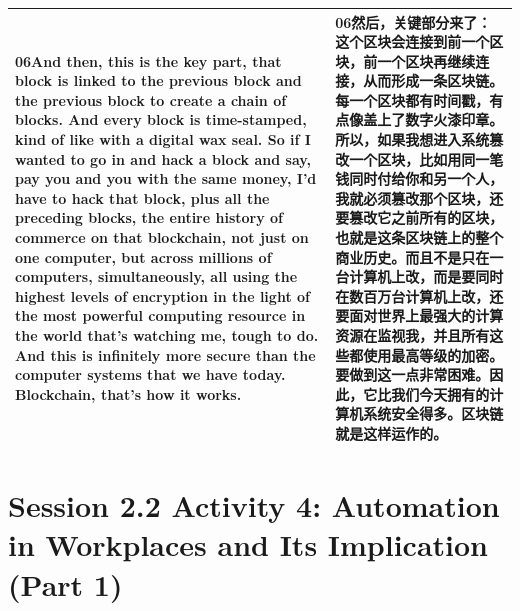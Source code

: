 \documentclass[UTF8,zihao=-4,fontset=fandol]{ctexart}
\newcommand{\TranscriptColumn}{\raggedright\arraybackslash\hyphenpenalty=10000\exhyphenpenalty=10000\sloppy}
\begin{document}
\begin{longtable}{>{\TranscriptColumn}p{} >{\TranscriptColumn}p{}}
\textbf{06}\quad And then, this is the key part, that block is linked to the previous block and the previous block to create a chain of blocks. And every block is time-stamped, kind of like with a digital wax seal. So if I wanted to go in and hack a block and say, pay you and you with the same money, I'd have to hack that block, plus all the preceding blocks, the entire history of commerce on that blockchain, not just on one computer, but across millions of computers, simultaneously, all using the highest levels of encryption in the light of the most powerful computing resource in the world that's watching me, tough to do. And this is infinitely more secure than the computer systems that we have today. Blockchain, that's how it works. & \textbf{06}\quad 然后，关键部分来了：这个区块会连接到前一个区块，前一个区块再继续连接，从而形成一条区块链。每一个区块都有时间戳，有点像盖上了数字火漆印章。所以，如果我想进入系统篡改一个区块，比如用同一笔钱同时付给你和另一个人，我就必须篡改那个区块，还要篡改它之前所有的区块，也就是这条区块链上的整个商业历史。而且不是只在一台计算机上改，而是要同时在数百万台计算机上改，还要面对世界上最强大的计算资源在监视我，并且所有这些都使用最高等级的加密。要做到这一点非常困难。因此，它比我们今天拥有的计算机系统安全得多。区块链就是这样运作的。 \\ \hline
\end{longtable}


\clearpage
\section{Session 2.2 Activity 4: Automation in Workplaces and Its Implication (Part 1)}
\end{document}
